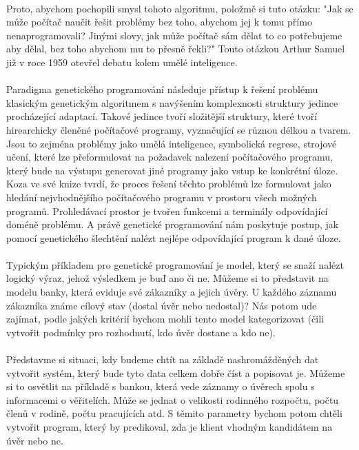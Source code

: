 \documentclass[bc,male,java,dept460]{diploma}		%
\begin{document}
\paragraph*{}
Proto, abychom pochopili smysl tohoto algoritmu, položmě si tuto otázku: "Jak se může počítač naučit řešit  problémy bez toho, abychom jej k tomu přímo nenaprogramovali? Jinými slovy, jak může počítač sám dělat to co potřebujeme aby dělal, bez toho abychom mu to přesně řekli?" Touto otázkou Arthur Samuel již v roce 1959 otevřel debatu kolem umělé inteligence.

\paragraph*{}
Paradigma genetického programování následuje přístup k řešení problému klasickým genetickým algoritmem s navýšením komplexnosti struktury jedince procházející adaptací. Takové jedince tvoří složitější struktury, které tvoří hirearchicky členěné počítačové programy, vyznačující se různou délkou a tvarem. Jsou to zejména problémy jako umělá inteligence, symbolická regrese, strojové učení, které lze přeformulovat na požadavek nalezení počítačového programu, který bude na výstupu generovat jiné programy jako vstup ke konkrétní úloze. Koza ve své knize tvrdí, že proces řešení těchto problémů lze formulovat jako hledání nejvhodnějšího počítačového programu v prostoru všech možných programů. Prohledávací prostor je tvořen funkcemi a terminály odpovídající doméně problému. A právě genetické programování nám poskytuje postup, jak pomocí genetického šlechtění nalézt nejlépe odpovídající program k dané úloze.

\paragraph*{}
Typickým příkladem pro genetické programování je model, který se snaží nalézt logický výraz, jehož výsledkem je buď ano či ne. Můžeme si to představit na modelu banky, která eviduje své zákazníky a jejich úvěry. U každého záznamu zákazníka známe cílový stav (dostal úvěr nebo nedostal)? Nás potom ude zajímat, podle jakých kritérií bychom mohli tento model kategorizovat (čili vytvořit podmínky pro rozhodnutí, kdo úvěr dostane a kdo ne).

\paragraph*{}
Představme si situaci, kdy budeme chtít na základě nashromážděných dat vytvořit systém, který bude tyto data celkem dobře číst a popisovat je. Můžeme si to osvětlit na příkladě s bankou, která vede záznamy o úvěrech spolu s informacemi o věřitelích. Může se jednat o velikosti rodinného rozpočtu, počtu členů v rodině, počtu pracujících atd. S těmito parametry bychom potom chtěli vytvořit program, který by predikoval, zda je klient vhodným kandidátem na úvěr nebo ne.
\end{document}

